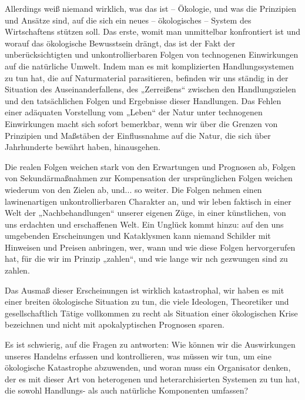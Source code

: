 \documentclass[11pt,a4paper]{article}
\begin{document}
Allerdings weiß niemand wirklich, was das ist -- Ökologie, und was die
Prinzipien und Ansätze sind, auf die sich ein neues -- ökologisches -- System
des Wirtschaftens stützen soll.  Das erste, womit man unmittelbar konfrontiert
ist und worauf das ökologische Bewusstsein drängt, das ist der Fakt der
unberücksichtigten und unkontrollierbaren Folgen von technogenen Einwirkungen
auf die natürliche Umwelt.  Indem man es mit komplizierten Handlungssystemen
zu tun hat, die auf Naturmaterial parasitieren, befinden wir uns ständig in
der Situation des Auseinanderfallens, des „Zerreißens“ zwischen den
Handlungszielen und den tatsächlichen Folgen und Ergebnisse dieser Handlungen.
Das Fehlen einer adäquaten Vorstellung vom „Leben“ der Natur unter technogenen
Einwirkungen macht sich sofort bemerkbar, wenn wir über die Grenzen von
Prinzipien und Maßstäben der Einflussnahme auf die Natur, die sich über
Jahrhunderte bewährt haben, hinausgehen.

Die realen Folgen weichen stark von den Erwartungen und Prognosen ab, Folgen
von Sekundärmaßnahmen zur Kompensation der ursprünglichen Folgen weichen
wiederum von den Zielen ab, und... so weiter. Die Folgen nehmen einen
lawinenartigen unkontrollierbaren Charakter an, und wir leben faktisch in
einer Welt der „Nachbehandlungen“ unserer eigenen Züge, in einer künstlichen,
von uns erdachten und erschaffenen Welt. Ein Unglück kommt hinzu: auf den uns
umgebenden Erscheinungen und Kataklysmen kann niemand Schilder mit Hinweisen
und Preisen anbringen, wer, wann und wie diese Folgen hervorgerufen hat, für
die wir im Prinzip „zahlen“, und wie lange wir nch gezwungen  sind zu zahlen.  

Das Ausmaß dieser Erscheinungen ist wirklich katastrophal, wir haben es mit
einer breiten ökologische Situation zu tun, die viele Ideologen, Theoretiker
und gesellschaftlich Tätige vollkommen zu recht als Situation einer
ökologischen Krise bezeichnen und nicht mit apokalyptischen Prognosen sparen.

Es ist schwierig, auf die Fragen zu antworten: Wie können wir die Auswirkungen
unseres Handelns erfassen und kontrollieren, was müssen wir tun, um eine
ökologische Katastrophe abzuwenden, und woran muss ein Organisator denken, der
es mit dieser Art von heterogenen und heterarchisierten Systemen zu tun hat,
die sowohl Handlungs- als auch natürliche Komponenten umfassen?
\end{document}
